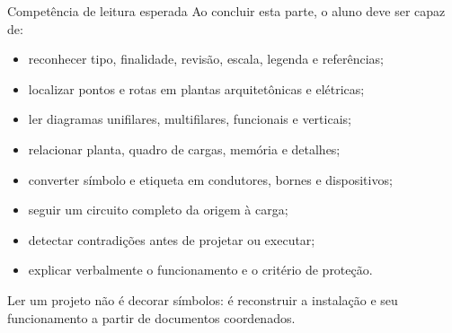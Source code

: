 \begin{frame}{Competência de leitura esperada}
\small
Ao concluir esta parte, o aluno deve ser capaz de:
\begin{itemize}
\item reconhecer tipo, finalidade, revisão, escala, legenda e referências;
\item localizar pontos e rotas em plantas arquitetônicas e elétricas;
\item ler diagramas unifilares, multifilares, funcionais e verticais;
\item relacionar planta, quadro de cargas, memória e detalhes;
\item converter símbolo e etiqueta em condutores, bornes e dispositivos;
\item seguir um circuito completo da origem à carga;
\item detectar contradições antes de projetar ou executar;
\item explicar verbalmente o funcionamento e o critério de proteção.
\end{itemize}
\begin{caixaObs}
Ler um projeto não é decorar símbolos: é reconstruir a instalação e seu funcionamento a partir de documentos coordenados.
\end{caixaObs}
\end{frame}
